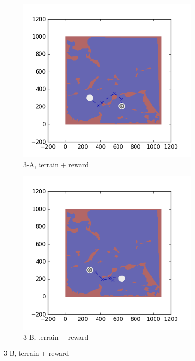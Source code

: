 \documentclass{tamuccthesis}
\begin{document}
\begin{figure}[H]
    \begin{subfigure}[b]{0.35\textwidth}  
        \centering
        \includegraphics[width=\textwidth,trim={4cm 3cm 2cm 3cm},clip]{EXP3RG_PathCa_-1_-1_0_-1.png}
        \caption{\small{3-A, terrain + reward}}  
        \label{fig:Path_3-A_terrain_reward}
    \end{subfigure}
    \hfill
    \begin{subfigure}[b]{0.35\textwidth}  
        \centering 
        \includegraphics[width=\textwidth,trim={4cm 3cm 2cm 3cm},clip]{EXP3RG_PathCb_-1_-1_0_-1.png}
        \caption{\small{3-B, terrain + reward}}
        \label{fig:Path_3-B_terrain_reward}
    \end{subfigure}
    

\end{figure}
\end{document}
